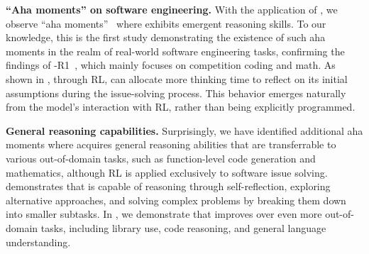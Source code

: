 \textbf{``Aha moments'' on software engineering.}
With the application of \tech, we observe ``aha moments''~\cite{deepseekr1} where \ours exhibits emergent reasoning skills.
To our knowledge, this is the first study demonstrating the existence of such aha moments in the realm of real-world software engineering tasks, confirming the findings of \dpsk-R1~\cite{deepseekr1}, which mainly focuses on competition coding and math.
As shown in , through RL, \ours[70] can allocate more thinking time to reflect on its initial assumptions during the issue-solving process.
This behavior emerges naturally from the model's interaction with RL, rather than being explicitly programmed.

\textbf{General reasoning capabilities.}
Surprisingly, we have identified additional aha moments where \ours acquires general reasoning abilities that are transferrable to various out-of-domain tasks, such as function-level code generation and mathematics, although RL is applied exclusively to software issue solving.
 demonstrates that \ours is capable of reasoning through self-reflection, exploring alternative approaches, and solving complex problems by breaking them down into smaller subtasks.
In , we demonstrate that \ours improves over even more out-of-domain tasks, including library use, code reasoning, and general language understanding.
